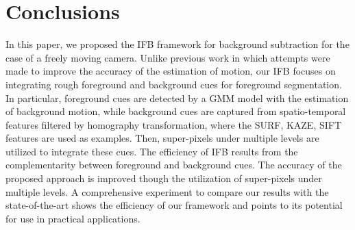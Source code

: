 \documentclass[journal]{IEEEtran}
\begin{document}
\section{Conclusions}
In this paper,
we proposed the IFB framework for background subtraction for the case of a freely moving camera.
Unlike previous work in which attempts were made to improve the accuracy of the estimation of motion,
our IFB focuses on integrating rough foreground and background cues for foreground segmentation.
In particular, 
foreground cues are detected by a GMM model with the estimation of background motion,
while background cues are captured from spatio-temporal features filtered by homography transformation,
where the SURF\cite{2006_SURF}, KAZE\cite{2012_KAZE}, SIFT\cite{lowe2004distinctive} features are used as examples.
Then, super-pixels under multiple levels are utilized to integrate these cues.
The efficiency of IFB results from the complementarity between foreground and background cues.
The accuracy of the proposed approach is improved though the utilization of super-pixels under multiple levels.
A comprehensive experiment to compare our results with the state-of-the-art shows the efficiency of our framework and points to its potential for use in practical applications.

\ifCLASSOPTIONcaptionsoff
  \newpage
\fi

  
  
\end{document}
